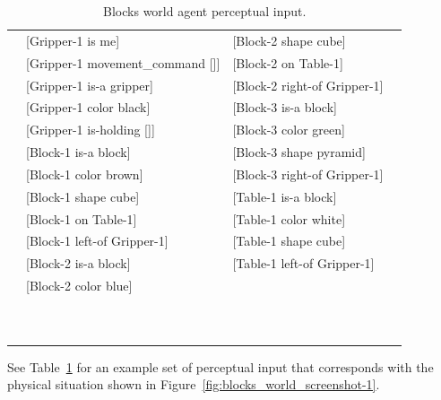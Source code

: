 \begin{table}
  \myfloatalign
  \begin{tabularx}{\textwidth}{XllX}
    & [Gripper-1 is me]                & [Block-2 shape cube]         & \\
    & [Gripper-1 movement\_command []] & [Block-2 on Table-1]         & \\
    & [Gripper-1 is-a gripper]         & [Block-2 right-of Gripper-1] & \\
    & [Gripper-1 color black]          & [Block-3 is-a block]         & \\
    & [Gripper-1 is-holding []]        & [Block-3 color green]        & \\
    & [Block-1 is-a block]             & [Block-3 shape pyramid]      & \\
    & [Block-1 color brown]            & [Block-3 right-of Gripper-1] & \\
    & [Block-1 shape cube]             & [Table-1 is-a block]         & \\
    & [Block-1 on Table-1]             & [Table-1 color white]        & \\
    & [Block-1 left-of Gripper-1]      & [Table-1 shape cube]         & \\
    & [Block-2 is-a block]             & [Table-1 left-of Gripper-1]  & \\
    & [Block-2 color blue]             &                              & \\

    & \\
    & \\
    & \\
    & \\
    & \\
    & \\
    & \\
    & \\
    & \\
    &
  \end{tabularx}
  \caption[Blocks world agent perceptual input.]{Blocks world agent perceptual input.}
  \label{tab:blocks_world_agent_perceptions}
\end{table}

See Table~\ref{tab:blocks_world_agent_perceptions} for an example set of perceptual input that corresponds with the physical situation shown in Figure~\ref{fig:blocks_world_screenshot-1}.





